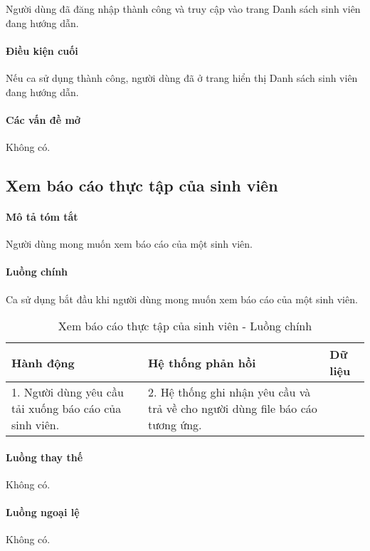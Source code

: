 \documentclass[./../main.tex]{subfiles}
\begin{document}
Người dùng đã đăng nhập thành công và truy cập vào trang Danh sách sinh viên đang hướng dẫn.

\paragraph*{Điều kiện cuối}

Nếu ca sử dụng thành công, người dùng đã ở trang hiển thị Danh sách sinh viên đang hướng dẫn.

\paragraph*{Các vấn đề mở}

Không có.

\subsection{Xem báo cáo thực tập của sinh viên}

\paragraph*{Mô tả tóm tắt}

Người dùng mong muốn xem báo cáo của một sinh viên.

\paragraph*{Luồng chính} Ca sử dụng bắt đầu khi người dùng mong muốn xem báo cáo của một sinh viên.

\begin{table}[H]
  \caption{Xem báo cáo thực tập của sinh viên - Luồng chính}
  \label{tab:view_report}
  \begin{tabularx}{\textwidth}{|X|X|X|}
    \hline
\textbf{Hành động} & \textbf{Hệ thống phản hồi} & \textbf{Dữ liệu} \\ \hline
1. Người dùng yêu cầu tải xuống báo cáo của sinh viên. & 2. Hệ thống ghi nhận yêu cầu và trả về cho người dùng file báo cáo tương ứng. &  \\ \hline
  \end{tabularx}
\end{table}

\paragraph*{Luồng thay thế} Không có.

\paragraph*{Luồng ngoại lệ} Không có.
\end{document}
